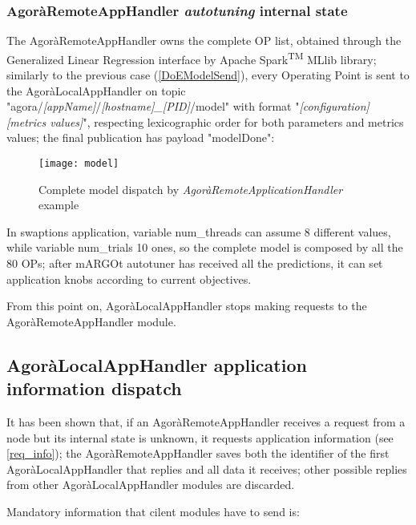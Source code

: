 \subsubsection{AgoràRemoteAppHandler \textit{autotuning} internal state}\label{modelSend}

The AgoràRemoteAppHandler owns the complete OP list, obtained through the Generalized Linear Regression interface by Apache Spark\textsuperscript{TM} MLlib library; similarly to the previous case (\ref{DoEModelSend}), every Operating Point is sent to the AgoràLocalAppHandler on topic "agora\slash{}\textit{[app\-Name]}\slash{}\textit{[host\-name]\_[PID]}\slash{}model" with format "\textit{[configuration] [metrics values]}", respecting lexicographic order for both parameters and metrics values; the final publication has payload "modelDone":

\begin{figure}[H]

    \centering
    \texttt{[image: model]}
    \caption{Complete model dispatch by \textit{AgoràRemoteApplicationHandler} example}
    \label{fig:model}
    
\end{figure}

In swaptions application, variable num\_threads can assume 8 different values, while variable num\_trials 10 ones, so the complete model is composed by all the 80 OPs; after mARGOt autotuner has received all the predictions, it can set application knobs according to current objectives.

From this point on, AgoràLocalAppHandler stops making requests to the AgoràRemoteAppHandler module.





\subsection{AgoràLocalAppHandler application information dispatch}\label{client_info}

It has been shown that, if an AgoràRemoteAppHandler receives a request from a node but its internal state is unknown, it requests application information (see \ref{req_info}); the AgoràRemoteAppHandler saves both the identifier of the first AgoràLocalAppHandler that replies and all data it receives; other possible replies from other AgoràLocalAppHandler modules are discarded.

Mandatory information that cilent modules have to send is:

